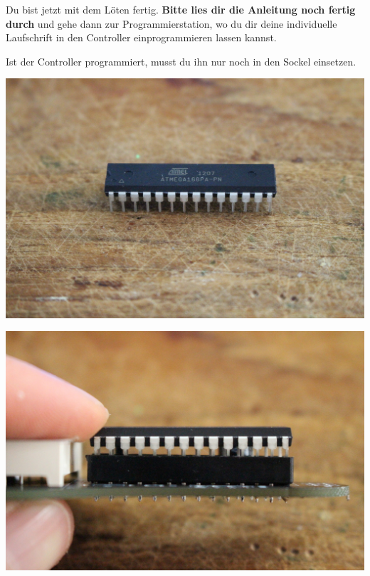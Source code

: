 \documentclass{article}
\begin{document}
Du bist jetzt mit dem Löten fertig. \textbf{Bitte lies dir die Anleitung noch fertig durch} und gehe dann zur Programmierstation, wo du dir deine individuelle Laufschrift in den Controller einprogrammieren lassen kannst.

Ist der Controller programmiert, musst du ihn nur noch in den Sockel einsetzen.

\vspace{1cm}

\begin{minipage}[b]{0.5\textwidth}
	\includegraphics[width=\textwidth]{Bilder2022/IMG_8239.JPG}
\end{minipage}
\begin{minipage}[b]{0.5\textwidth}
	\includegraphics[width=\textwidth]{Bilder2022/IMG_8240.JPG}
\end{minipage}
\end{document}
